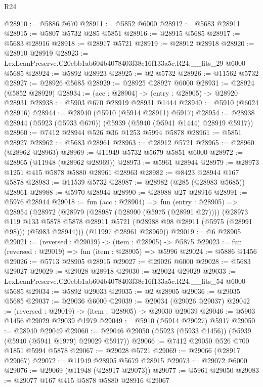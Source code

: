 \begin{lexlean}{R24}
\begin{coremodule}
@28910 := @5886 @670
@28911 := @5852 @6000
@28912 := @5683 @28911
@28915 := @5807 @5732 @285 @5851
@28916 := @28915 @5685
@28917 := @5683 @28916
@28918 := @28917 @5721
@28919 := @28912 @28918
@28920 := @28910 @28919
@28923 := LexLeanPreserve.C20ebb1ab604b4078403f38c16f133a5c.R24.__fits_29 @6000 @5685
@28924 := @5892 @28923
@28925 := @2 @5732
@28926 := @11562 @5732
@28927 := @28926 @5685
@28929 := @28925 @28927 @6000
@28931 := @28924 (@5852 @28929)
@28934 := (acc : @28904) -> (entry : @28905) -> @28920 @28931
@28938 := @5903 @670 @28919 @28931 @1444
@28940 := @5910 (@6024 @28916)
@28944 := @28940 (@5910 (@5914 @28911) @5917)
@28954 := @28938 @28944 (@5923 (@5933 @670)) (@5939 (@5940 (@5941 @1444) @28919 @5917))
@28960 := @7412 @28944 @526 @36 @1253 @5994 @5878
@28961 := @5851 @28927
@28962 := @5683 @28961
@28963 := @28912 @5721
@28965 := @28960 (@28962 @28963)
@28969 := @11949 @5732 @5679 @5851 @6000
@28972 := @28965 (@11948 (@28962 @28969))
@28973 := @5961 @28944
@28979 := @28973 @1251 @415 @5878 @5880 @28961 @28963
@28982 := @8423 @28944 @167 @5878
@28983 := @11539 @5732
@28987 := @28982 (@285 (@28983 @5685)) @28961
@28988 := @5970 @28944
@28990 := @28988 @27 @28916
@28991 := @5976 @28944
@29018 := fun (acc : @28904) =>
  fun (entry : @28905) =>
  @28954
    (@28972
      (@28979
        (@28987 (@28990 (@5975 (@28991 @27))))
        (@28973
          @119
          @133
          @5878
          @5878
          @28911
          @5721
          (@28988 @98 @28911 (@5975 (@28991 @98)))
          (@5983 @28944)))
      (@11997 @28961 @28969))
@29019 := @6 @28905
@29021 := (reversed : @29019) -> (item : @28905) -> @5875
@29023 := fun (reversed : @29019) => fun (item : @28905) => @5996
@29024 := @5886 @1456
@29026 := @5713 @28905 @28915
@29027 := @29026 @6000
@29028 := @5683 @29027
@29029 := @29028 @28918
@29030 := @29024 @29029
@29033 := LexLeanPreserve.C20ebb1ab604b4078403f38c16f133a5c.R24.__fits_54 @6000 @5685
@29034 := @5892 @29033
@29035 := @2 @28905
@29036 := @29035 @5685
@29037 := @29036 @6000
@29039 := @29034 (@29026 @29037)
@29042 := (reversed : @29019) -> (item : @28905) -> @29030 @29039
@29046 := @5903 @1456 @29029 @29039 @1979
@29049 := @5910 (@5914 @29027) @5917
@29050 := @28940 @29049
@29060 := @29046 @29050 (@5923 (@5933 @1456)) (@5939 (@5940 (@5941 @1979) @29029 @5917))
@29066 := @7412 @29050 @526 @700 @1851 @5994 @5878
@29067 := @29028 @5721
@29069 := @29066 (@28917 @29067)
@29072 := @11949 @28905 @5679 @28915
@29073 := @29072 @6000
@29076 := @29069 (@11948 (@28917 @29073))
@29077 := @5961 @29050
@29083 := @29077 @167 @415 @5878 @5880 @28916 @29067

\end{coremodule}
\end{lexlean}
